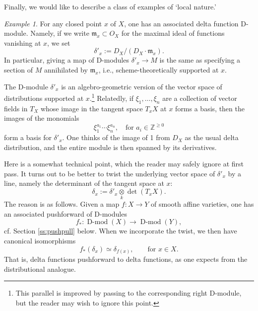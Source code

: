 \documentclass[10pt]{amsart}
\newcommand{\on}{\operatorname}
\theoremstyle{remark}
\newtheorem{ex}[subsubsection]{Example}
\newcommand{\fm}{\mathfrak{m}}
\numberwithin{equation}{section}
\begin{document}
	Finally, we would like to describe a class of examples of `local nature.' 
	\begin{ex} For any closed point $x$ of $X$, one has an associated delta 
	function D-module. Namely, if we write $\fm_x \subset O_X$ for the maximal 
	ideal of functions vanishing at $x$, we set 
		\[
		\delta'_x := D_X / (D_X \cdot \fm_x). 
		\]
		In particular, giving a map of D-modules $\delta'_x \rightarrow M$ is 
		the same as specifying a section of $M$ annihilated by $\fm_x$, i.e., 
		scheme-theoretically supported at $x$.  
		
		The D-module $\delta'_x$ is an algebro-geometric version of the vector 
		space of distributions supported at $x$.\footnote{This parallel is 
		improved by passing to the corresponding right D-module, but the reader 
		may wish to ignore this point.} Relatedly, if $\xi_1, \ldots, \xi_n$ 
		are a collection of vector fields in $T_X$ whose image in the tangent 
		space $T_x X$ at $x$ forms a basis, then the images of the monomials 
		\begin{equation} \label{PBW}
		\xi_1^{a_1} \cdots \xi_n^{a_n}, \quad \text{for } a_i \in 
		\mathbb{Z}^{\geqslant 0}
		\end{equation}
		form a basis for $\delta'_x$. One thinks of the image of 1 from $D_X$ 
		as the usual delta distribution, and the entire module is then spanned by 
		its derivatives. 
		
		Here is a somewhat technical point, which the reader may safely ignore 
		at first pass. It turns out to be better to twist the underlying vector 
		space of $\delta'_x$ by a line, namely the determinant of the tangent 
		space at $x$:
		\[
		\delta_x := \delta'_x \underset{k} \otimes \det(T_xX).
		\]
		The reason is as follows. Given a map $f: X \rightarrow Y$ of smooth affine varieties, one has an associated pushforward of D-modules $$f_*: 
		\on{D-mod}(X) \rightarrow \on{D-mod}(Y),$$cf. Section \ref{ss:pushpull} below. When we incorporate the 
		twist, we then have canonical isomorphisms
		\[
		f_*( \delta_{x} ) \simeq \delta_{f(x)}, \quad \quad \text{for } x \in X.
		\]
		That is, delta functions pushforward to delta functions, as one expects 
		from the distributional analogue. \end{ex}
	
\end{document}
